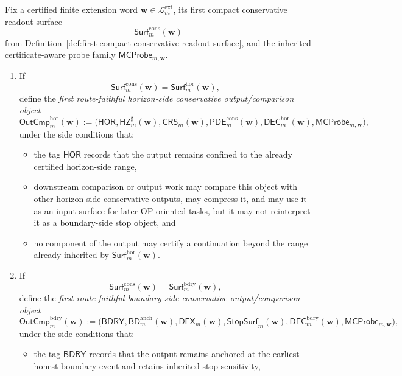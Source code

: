 \begin{definition}
\label{def:first-route-faithful-conservative-output-comparison-layer}
Fix a certified finite extension word \(\mathbf w\in\mathcal L^{\mathrm{ext}}_{m}\), its first compact conservative readout surface
\[
  \mathsf{Surf}^{\mathrm{cons}}_{m}(\mathbf w)
\]
from Definition~\ref{def:first-compact-conservative-readout-surface}, and the inherited certificate-aware probe family \(\mathsf{MCProbe}_{m,\mathbf w}\).
\begin{enumerate}[label=(\roman*)]
  \item If
  \[
    \mathsf{Surf}^{\mathrm{cons}}_{m}(\mathbf w)=\mathsf{Surf}^{\mathrm{hor}}_{m}(\mathbf w),
  \]
  define the \emph{first route-faithful horizon-side conservative output/comparison object}
  \[
    \mathsf{OutCmp}^{\mathrm{hor}}_{m}(\mathbf w)
    :=
    \bigl(\mathsf{HOR},\mathsf{HZ}^{\sharp}_{m}(\mathbf w),\mathsf{CRS}_{m}(\mathbf w),\mathsf{PDE}^{\mathrm{cons}}_{m}(\mathbf w),\mathsf{DEC}^{\mathrm{hor}}_{m}(\mathbf w),\mathsf{MCProbe}_{m,\mathbf w}\bigr),
  \]
  under the side conditions that:
  \begin{itemize}[leftmargin=2em]
    \item the tag \(\mathsf{HOR}\) records that the output remains confined to the already certified horizon-side range,
    \item downstream comparison or output work may compare this object with other horizon-side conservative outputs, may compress it, and may use it as an input surface for later OP-oriented tasks, but it may not reinterpret it as a boundary-side stop object, and
    \item no component of the output may certify a continuation beyond the range already inherited by \(\mathsf{Surf}^{\mathrm{hor}}_{m}(\mathbf w)\).
  \end{itemize}
  \item If
  \[
    \mathsf{Surf}^{\mathrm{cons}}_{m}(\mathbf w)=\mathsf{Surf}^{\mathrm{bdry}}_{m}(\mathbf w),
  \]
  define the \emph{first route-faithful boundary-side conservative output/comparison object}
  \[
    \mathsf{OutCmp}^{\mathrm{bdry}}_{m}(\mathbf w)
    :=
    \bigl(\mathsf{BDRY},\mathsf{BD}^{\mathrm{anch}}_{m}(\mathbf w),\mathsf{DFX}_{m}(\mathbf w),\mathsf{StopSurf}_{m}(\mathbf w),\mathsf{DEC}^{\mathrm{bdry}}_{m}(\mathbf w),\mathsf{MCProbe}_{m,\mathbf w}\bigr),
  \]
  under the side conditions that:
  \begin{itemize}[leftmargin=2em]
    \item the tag \(\mathsf{BDRY}\) records that the output remains anchored at the earliest honest boundary event and retains inherited stop sensitivity,

\end{itemize}
\end{enumerate}
\end{definition}
